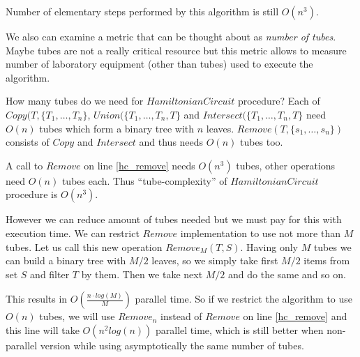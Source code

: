 Number of elementary steps performed by this algorithm is still $O(n^3)$.

We also can examine a metric that can be thought about as \emph{number of tubes}. Maybe tubes are not a really critical resource but this metric allows to measure number of laboratory equipment (other than tubes) used to execute the algorithm. 

How many tubes do we need for $HamiltonianCircuit$ procedure? Each of $Copy(T, \{T_1, \dots, T_n\}$, $Union(\{T_1, \dots, T_n, T\}$ and $Intersect(\{T_1, \dots, T_n, T\}$ need $O(n)$ tubes which form a binary tree with $n$ leaves. $Remove(T, \{s_1, \dots, s_n\})$ consists of $Copy$ and $Intersect$ and thus needs $O(n)$ tubes too.

A call to $Remove$ on line \ref{hc_remove} needs $O(n^3)$ tubes, other operations need $O(n)$ tubes each. Thus ``tube-complexity'' of $HamiltonianCircuit$ procedure is $O(n^3)$. 

However we can reduce amount of tubes needed but we must pay for this with execution time. We can restrict $Remove$ implementation to use not more than $M$ tubes. Let us call this new operation $Remove_M(T, S)$. Having only $M$ tubes we can build a binary tree with $M/2$ leaves, so we simply take first $M/2$ items from set $S$ and filter $T$ by them. Then we take next $M/2$ and do the same and so on.


This results in $O\left(\frac{n \cdot log(M)}{M}\right)$ parallel time. So if we restrict the algorithm to use $O(n)$ tubes, we will use $Remove_n$ instead of $Remove$ on line \ref{hc_remove} and this line will take $O( n^2 log(n))$ parallel time, which is still better when non-parallel version while using asymptotically the same number of tubes.